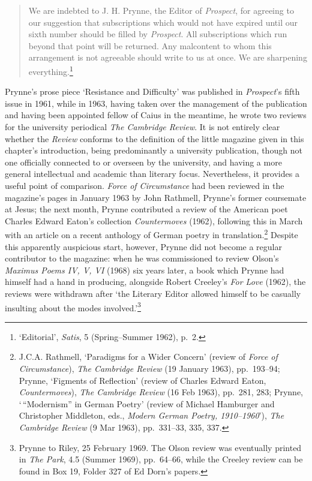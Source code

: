 \documentclass[]{article}
\begin{document}
\begin{quote}
We are indebted to J. H. Prynne, the Editor of \emph{Prospect}, for
agreeing to our suggestion that subscriptions which would not have
expired until our sixth number should be filled by \emph{Prospect}. All
subscriptions which run beyond that point will be returned. Any
malcontent to whom this arrangement is not agreeable should write to us
at once. We are sharpening everything.\footnote{`Editorial',
  \emph{Satis}, 5 (Spring--Summer 1962), p.~2.}
\end{quote}

\noindent Prynne's prose piece `Resistance and Difficulty' was published
in \emph{Prospect}'s fifth issue in 1961, while in 1963, having taken
over the management of the publication and having been appointed fellow
of Caius in the meantime, he wrote two reviews for the university
periodical \emph{The Cambridge Review}. It is not entirely clear whether
the \emph{Review} conforms to the definition of the little magazine
given in this chapter's introduction, being predominantly a university
publication, though not one officially connected to or overseen by the
university, and having a more general intellectual and academic than
literary focus. Nevertheless, it provides a useful point of comparison.
\emph{Force of Circumstance} had been reviewed in the magazine's pages
in January 1963 by John Rathmell, Prynne's former coursemate at Jesus;
the next month, Prynne contributed a review of the American poet Charles
Edward Eaton's collection \emph{Countermoves} (1962), following this in
March with an article on a recent anthology of German poetry in
translation.\footnote{J.C.A. Rathmell, `Paradigms for a Wider Concern'
  (review of \emph{Force of Circumstance}), \emph{The Cambridge Review}
  (19 January 1963), pp.~193--94; Prynne, `Figments of Reflection'
  (review of Charles Edward Eaton, \emph{Countermoves}), \emph{The
  Cambridge Review} (16 Feb 1963), pp.~281, 283; Prynne,
  `\,``Modernism'' in German Poetry' (review of Michael Hamburger and
  Christopher Middleton, eds., \emph{Modern German Poetry,
  1910--1960}'), \emph{The Cambridge Review} (9 Mar 1963), pp.~331--33,
  335, 337.} Despite this apparently auspicious start, however, Prynne
did not become a regular contributor to the magazine: when he was
commissioned to review Olson's \emph{Maximus Poems IV, V, VI} (1968) six
years later, a book which Prynne had himself had a hand in producing,
alongside Robert Creeley's \emph{For Love} (1962), the reviews were
withdrawn after `the Literary Editor allowed himself to be casually
insulting about the modes involved.'\footnote{Prynne to Riley, 25
  February 1969. The Olson review was eventually printed in \emph{The
  Park}, 4.5 (Summer 1969), pp.~64--66, while the Creeley review can be
  found in Box 19, Folder 327 of Ed Dorn's papers.}
\end{document}
